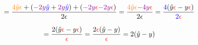 \documentclass{article}
\begin{document}
\begin{displaymath}
=\frac{\textcolor{orange}{4\hat{y}\epsilon}+(\textcolor{violet}{-2y}
\textcolor{blue}{\hat{y}}+\textcolor{violet}{2y}
\textcolor{blue}{\hat{y}})+(\textcolor{violet}{-2y}
\textcolor{red}{\epsilon}\textcolor{violet}{-2y}
\textcolor{red}{\epsilon})}{2\epsilon}
=\frac{\textcolor{orange}{4\hat{y}\epsilon}\textcolor{violet}{-4y}
\textcolor{red}{\epsilon}}{2\epsilon}
=\frac{\textcolor{blue}{4}(\hat{y}\textcolor{red}{\epsilon}-
y\textcolor{red}{\epsilon})}
{\textcolor{blue}{2}\textcolor{red}{\epsilon}}
\end{displaymath}

\begin{displaymath}
=\frac{2(\hat{y}\textcolor{red}{\epsilon}-y\textcolor{red}{\epsilon})}
{\textcolor{red}{\epsilon}}
=\frac{2\textcolor{red}{\epsilon}(\hat{y}-y)}
{\textcolor{red}{\epsilon}}
=2(\hat{y}-y)
\end{displaymath}
\end{document}
